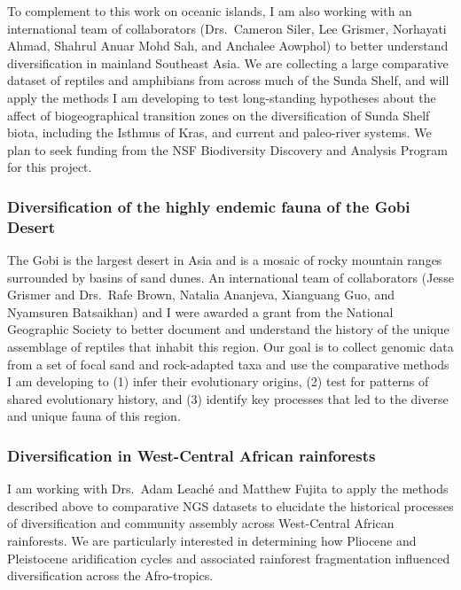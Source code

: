 To complement to this work on oceanic islands, I am also working with an
international team of collaborators
(Drs.\ Cameron Siler,
Lee Grismer,
Norhayati Ahmad,
Shahrul Anuar Mohd Sah,
and
Anchalee Aowphol)
to better understand diversification in
mainland Southeast Asia.
We are collecting a large comparative dataset of reptiles and amphibians from
across much of the Sunda Shelf, and will apply the
methods I am developing to test long-standing hypotheses about the affect of
biogeographical transition zones on the diversification of Sunda Shelf biota,
including the Isthmus of Kras, and current and paleo-river systems.
We plan to seek funding from the NSF Biodiversity Discovery and Analysis
Program for this project.

\subsubsection*{Diversification of the highly endemic fauna of the Gobi Desert}
The Gobi is the largest desert in Asia and is a mosaic of rocky mountain ranges
surrounded by basins of sand dunes.
An international team of collaborators (Jesse Grismer and Drs.\ Rafe Brown,
Natalia Ananjeva, Xianguang Guo, and Nyamsuren Batsaikhan) and I were awarded a
grant from the National Geographic Society to better document and understand
the history of the unique assemblage of reptiles that inhabit this region.
Our goal is to collect genomic data from a set of focal sand and rock-adapted
taxa and use the comparative methods I am developing to
(1) infer their evolutionary origins,
(2) test for patterns of shared evolutionary history, and
(3) identify key processes that led to the diverse and unique fauna of this
region.

\subsubsection*{Diversification in West-Central African rainforests}
I am working with Drs.\ Adam Leach\'{e} and Matthew Fujita to apply the methods
described above to comparative NGS datasets to elucidate the historical
processes of diversification and community assembly across West-Central African
rainforests.
We are particularly interested in determining how Pliocene and Pleistocene
aridification cycles and associated rainforest fragmentation influenced
diversification across the Afro-tropics.

